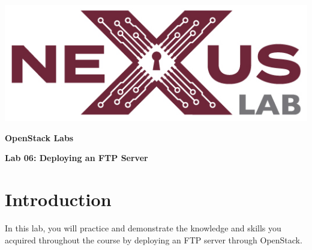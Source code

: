 \documentclass[letterpaper, 12pt]{article}
\begin{document}
\begin{titlepage}
    \centering
    \includegraphics[scale=0.5]{images/nexus_lab_logo.png}

    \vspace*{\baselineskip}

    \textbf{\Large OpenStack Labs}

    \vspace*{\baselineskip}

    \textbf{\Large Lab 06: Deploying an FTP Server}
    \vspace*{\fill}
\end{titlepage}

{
    \fancyhf{}
    \fancyfoot[R]{\footnotesize\thepage}
    \renewcommand{\headrulewidth}{0pt}
}

\pagestyle{fancy}
\tableofcontents
\clearpage

\section*{Introduction}
\label{sec:introduction}
In this lab, you will practice and demonstrate the knowledge and skills you acquired throughout the course by deploying
an FTP server through OpenStack.
\end{document}
